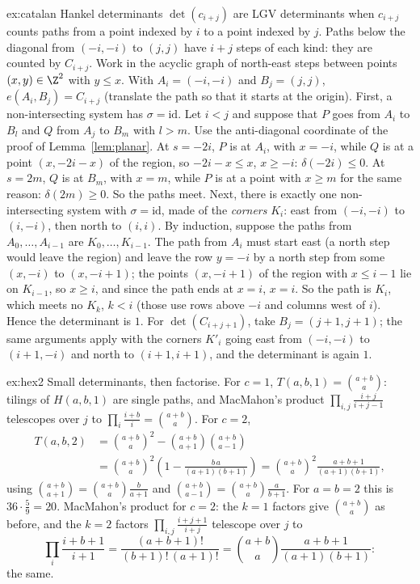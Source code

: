\begin{solution}{ex:catalan}
\idea Hankel determinants $\det(c_{i+j})$ are LGV determinants when $c_{i+j}$ counts paths from a point indexed by $i$ to a
point indexed by $j$. Paths below the diagonal from $(-i,-i)$ to $(j,j)$ have $i+j$ steps of each kind: they are counted
by $C_{i+j}$.
\writeup Work in the acyclic graph of north-east steps between points $(x,y)\in\Z^2$ with $y\le x$. With $A_i=(-i,-i)$ and
$B_j=(j,j)$, $e(A_i,B_j)=C_{i+j}$ (translate the path so that it starts at the origin). First, a non-intersecting system
has $\sigma=\mathrm{id}$. Let $i<j$ and suppose that $P$ goes from $A_i$ to $B_l$ and $Q$ from $A_j$ to $B_m$ with $l>m$.
Use the anti-diagonal coordinate of the proof of Lemma~\ref{lem:planar}. At $s=-2i$, $P$ is at $A_i$, with $x=-i$, while $Q$
is at a point $(x,-2i-x)$ of the region, so $-2i-x\le x$, $x\ge-i$: $\delta(-2i)\le0$. At $s=2m$, $Q$ is at $B_m$, with $x=m$,
while $P$ is at a point with $x\ge m$ for the same reason: $\delta(2m)\ge0$. So the paths meet. Next, there is exactly one
non-intersecting system with $\sigma=\mathrm{id}$, made of the \emph{corners} $K_i$: east from $(-i,-i)$ to $(i,-i)$, then north
to $(i,i)$. By induction, suppose the paths from $A_0,\dots,A_{i-1}$ are $K_0,\dots,K_{i-1}$. The path from $A_i$ must start
east (a north step would leave the region) and leave the row $y=-i$ by a north step from some $(x,-i)$ to $(x,-i+1)$; the
points $(x,-i+1)$ of the region with $x\le i-1$ lie on $K_{i-1}$, so $x\ge i$, and since the path ends at $x=i$, $x=i$. So
the path is $K_i$, which meets no $K_k$, $k<i$ (those use rows above $-i$ and columns west of $i$). Hence the
determinant is $1$. For $\det(C_{i+j+1})$, take $B_j=(j+1,j+1)$; the same arguments apply with the corners $K'_i$ going
east from $(-i,-i)$ to $(i+1,-i)$ and north to $(i+1,i+1)$, and the determinant is again $1$.
\end{solution}

\begin{solution}{ex:hex2}
\idea Small determinants, then factorise.
\writeup For $c=1$, $T(a,b,1)=\binom{a+b}a$: tilings of $H(a,b,1)$ are single paths, and MacMahon's product
$\prod_{i,j}\frac{i+j}{i+j-1}$ telescopes over $j$ to $\prod_i\frac{i+b}i=\binom{a+b}a$. For $c=2$,
\[
\begin{aligned}T(a,b,2)&=\binom{a+b}a^2-\binom{a+b}{a+1}\binom{a+b}{a-1}\\&=\binom{a+b}a^2\left(1-\frac{b\,a}{(a+1)(b+1)}\right)=\binom{a+b}a^2\frac{a+b+1}{(a+1)(b+1)},\end{aligned}
\]
using $\binom{a+b}{a+1}=\binom{a+b}a\frac b{a+1}$ and $\binom{a+b}{a-1}=\binom{a+b}a\frac a{b+1}$. For $a=b=2$ this is
$36\cdot\frac59=20$. MacMahon's product for $c=2$: the $k=1$ factors give $\binom{a+b}a$ as before, and the $k=2$ factors
$\prod_{i,j}\frac{i+j+1}{i+j}$ telescope over $j$ to
\[
\prod_i\frac{i+b+1}{i+1}=\frac{(a+b+1)!}{(b+1)!\,(a+1)!}=\binom{a+b}a\frac{a+b+1}{(a+1)(b+1)}:
\]
the same.
\end{solution}

